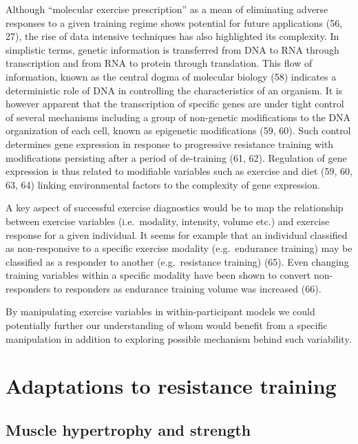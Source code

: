 \documentclass[twoside,10pt]{gihclass} %
\begin{document}
Although ``molecular exercise prescription'' as a mean of eliminating adverse responses to a given training regime shows potential for future applications
(56, 27), the rise of data intensive techniques has also highlighted its complexity.
In simplistic terms, genetic information is transferred from DNA to RNA through transcription and from RNA to protein through translation. This flow of information, known as the central dogma of molecular biology
(58)
indicates a deterministic role of DNA in controlling the characteristics of an organism. It is however apparent that the transcription of specific genes are under tight control of several mechanisms including a group of non-genetic modifications to the DNA organization of each cell, known as epigenetic modifications
(59, 60).
Such control determines gene expression in response to progressive resistance training with modifications persisting after a period of de-training
(61, 62).
Regulation of gene expression is thus related to modifiable variables such as exercise and diet
(59, 60, 63, 64)
linking environmental factors to the complexity of gene expression.

A key aspect of successful exercise diagnostics would be to map the relationship between exercise variables (i.e.~modality, intensity, volume etc.) and exercise response for a given individual.
It seems for example that an individual classified as non-responsive to a specific exercise modality (e.g.~endurance training) may be classified as a responder to another (e.g.~resistance training)
(65).
Even changing training variables within a specific modality have been shown to convert non-responders to responders as endurance training volume was increased
(66).

By manipulating exercise variables in within-participant models we could potentially further our understanding of whom would benefit from a specific manipulation in addition to exploring possible mechanism behind such variability.

\hypertarget{adaptations-to-resistance-training}{%
\section{Adaptations to resistance training}\label{adaptations-to-resistance-training}}

\hypertarget{muscle-hypertrophy-and-strength}{%
\subsection{Muscle hypertrophy and strength}\label{muscle-hypertrophy-and-strength}}
\end{document}
